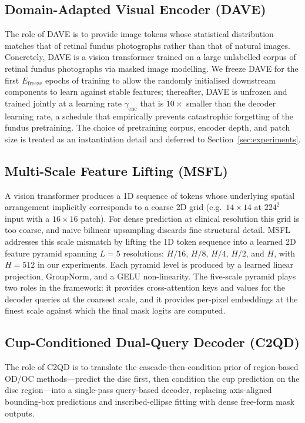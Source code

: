 \documentclass[10pt,journal,twocolumn]{IEEEtran}
\begin{document}
\subsection{Domain-Adapted Visual Encoder (DAVE)}

The role of DAVE is to provide image tokens whose statistical distribution matches that of retinal fundus photographs rather than that of natural images. Concretely, DAVE is a vision transformer trained on a large unlabelled corpus of retinal fundus photographs via masked image modelling. We freeze DAVE for the first $E_\text{freeze}$ epochs of training to allow the randomly initialised downstream components to learn against stable features; thereafter, DAVE is unfrozen and trained jointly at a learning rate $\gamma_\text{enc}$ that is $10\times$ smaller than the decoder learning rate, a schedule that empirically prevents catastrophic forgetting of the fundus pretraining. The choice of pretraining corpus, encoder depth, and patch size is treated as an instantiation detail and deferred to Section~\ref{sec:experiments}.

\subsection{Multi-Scale Feature Lifting (MSFL)}

A vision transformer produces a 1D sequence of tokens whose underlying spatial arrangement implicitly corresponds to a coarse 2D grid (e.g.\ $14\!\times\!14$ at $224^2$ input with a $16\!\times\!16$ patch). For dense prediction at clinical resolution this grid is too coarse, and naive bilinear upsampling discards fine structural detail. MSFL addresses this scale mismatch by lifting the 1D token sequence into a learned 2D feature pyramid spanning $L=5$ resolutions: $H/16$, $H/8$, $H/4$, $H/2$, and $H$, with $H=512$ in our experiments. Each pyramid level is produced by a learned linear projection, GroupNorm, and a GELU non-linearity. The five-scale pyramid plays two roles in the framework: it provides cross-attention keys and values for the decoder queries at the coarsest scale, and it provides per-pixel embeddings at the finest scale against which the final mask logits are computed.

\subsection{Cup-Conditioned Dual-Query Decoder (C2QD)}

The role of C2QD is to translate the cascade-then-condition prior of region-based OD/OC methods---predict the disc first, then condition the cup prediction on the disc region---into a single-pass query-based decoder, replacing axis-aligned bounding-box predictions and inscribed-ellipse fitting with dense free-form mask outputs.
\end{document}
